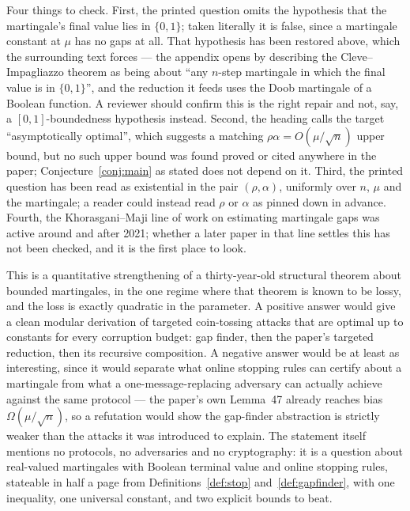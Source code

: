 \documentclass{aicr-conjecture}
\begin{document}
\begin{remark}\label{rem:caveats}
Four things to check. First, the printed question omits the hypothesis
that the martingale's final value lies in $\{0,1\}$; taken literally it
is false, since a martingale constant at $\mu$ has no gaps at all. That
hypothesis has been restored above, which the surrounding text forces
--- the appendix opens by describing the Cleve--Impagliazzo theorem as
being about ``any $n$-step martingale in which the final value is in
$\{0,1\}$'', and the reduction it feeds uses the Doob martingale of a
Boolean function. A reviewer should confirm this is the right repair
and not, say, a $[0,1]$-boundedness hypothesis instead. Second, the
heading calls the target ``asymptotically optimal'', which suggests a
matching $\rho\alpha = O(\mu/\sqrt{n})$ upper bound, but no such upper
bound was found proved or cited anywhere in the paper;
Conjecture~\ref{conj:main} as stated does not depend on it. Third, the
printed question has been read as existential in the pair
$(\rho,\alpha)$, uniformly over $n$, $\mu$ and the martingale; a reader
could instead read $\rho$ or $\alpha$ as pinned down in advance. Fourth,
the Khorasgani--Maji line of work on estimating martingale gaps was
active around and after 2021; whether a later paper in that line settles
this has not been checked, and it is the first place to look.
\end{remark}

\begin{remark}\label{rem:interest}
This is a quantitative strengthening of a thirty-year-old structural
theorem about bounded martingales, in the one regime where that theorem
is known to be lossy, and the loss is exactly quadratic in the
parameter. A positive answer would give a clean modular derivation of
targeted coin-tossing attacks that are optimal up to constants for every
corruption budget: gap finder, then the paper's targeted reduction, then
its recursive composition. A negative answer would be at least as
interesting, since it would separate what online stopping rules can
certify about a martingale from what a one-message-replacing adversary
can actually achieve against the same protocol --- the paper's own
Lemma~47 already reaches bias $\Omega(\mu/\sqrt{n})$, so a refutation
would show the gap-finder abstraction is strictly weaker than the
attacks it was introduced to explain. The statement itself mentions no
protocols, no adversaries and no cryptography: it is a question about
real-valued martingales with Boolean terminal value and online stopping
rules, stateable in half a page from
Definitions~\ref{def:stop} and~\ref{def:gapfinder}, with one inequality,
one universal constant, and two explicit bounds to beat.
\end{remark}
\end{document}
